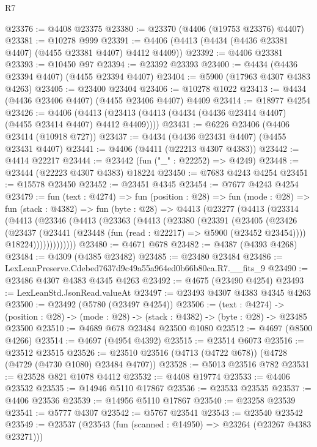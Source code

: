 \begin{lexlean}{R7}
\begin{coremodule}
@23376 := @4408 @23375
@23380 := @23370 (@4406 (@19753 @23376) @4407)
@23381 := @10278 @999
@23391 := @4406 (@4413 (@4434 (@4436 @23381 @4407) (@4455 @23381 @4407) @4412 @4409))
@23392 := @4406 @23381
@23393 := @10450 @97
@23394 := @23392 @23393
@23400 := @4434 (@4436 @23394 @4407) (@4455 @23394 @4407)
@23404 := @5900 (@17963 @4307 @4383 @4263)
@23405 := @23400 @23404
@23406 := @10278 @1022
@23413 := @4434 (@4436 @23406 @4407) (@4455 @23406 @4407) @4409
@23414 := @18977 @4254
@23426 := @4406
    (@4413 (@23413 (@4413 (@4434 (@4436 @23414 @4407) (@4455 @23414 @4407) @4412 @4409))))
@23431 := @6226 @23406 (@4406 @23414 (@10918 @727))
@23437 := @4434 (@4436 @23431 @4407) (@4455 @23431 @4407)
@23441 := @4406 (@4411 (@22213 @4307 @4383))
@23442 := @4414 @22217
@23444 := @23442 (fun ("_" : @22252) => @4249)
@23448 := @23444 (@22223 @4307 @4383) @18224
@23450 := @7683 @4243 @4254
@23451 := @15578 @23450
@23452 := @23451 @4345
@23454 := @7677 @4243 @4254
@23479 := fun (text : @4274) =>
  fun (position : @28) =>
  fun (mode : @28) =>
  fun (stack : @4382) =>
  fun (byte : @28) =>
  @4413
    (@23277
      (@4413
        (@23314
          (@4413
            (@23346
              (@4413
                (@23363
                  (@4413
                    (@23380
                      (@23391
                        (@23405
                          (@23426
                            (@23437
                              (@23441 (@23448 (fun (read : @22217) => @5900 (@23452 @23454))))
                              @18224)))))))))))))
@23480 := @4671 @678
@23482 := @4387 (@4393 @4268)
@23484 := @4309 (@4385 @23482)
@23485 := @23480 @23484
@23486 := LexLeanPreserve.Cdebed7637d9c49a55a964ed0b66b80ca.R7.__fits_9
@23490 := @23486 @4307 @4383 @4345 @4263
@23492 := @4675 (@23490 @4254)
@23493 := LexLeanStd.JsonRead.valueAt
@23497 := @23493 @4307 @4383 @4345 @4263
@23500 := @23492 (@5780 (@23497 @4254))
@23506 := (text : @4274) ->
  (position : @28) -> (mode : @28) -> (stack : @4382) -> (byte : @28) -> @23485 @23500
@23510 := @4689 @678 @23484 @23500 @1080
@23512 := @4697 (@8500 @4266)
@23514 := @4697 (@4954 @4392)
@23515 := @23514 @6073
@23516 := @23512 @23515
@23526 := @23510 @23516 (@4713 (@4722 @678)) (@4728 (@4729 (@4730 @1080) @23484 @4707))
@23528 := @5013 @23516 @782
@23531 := @23528 @821 @1078 @4412
@23532 := @4408 @19774
@23533 := @4406 @23532
@23535 := @14946 @5110 @17867
@23536 := @23533 @23535
@23537 := @4406 @23536
@23539 := @14956 @5110 @17867
@23540 := @23258 @23539
@23541 := @5777 @4307
@23542 := @5767 @23541
@23543 := @23540 @23542
@23549 := @23537 (@23543 (fun (scanned : @14950) => @23264 (@23267 @4383 @23271)))

\end{coremodule}
\end{lexlean}
